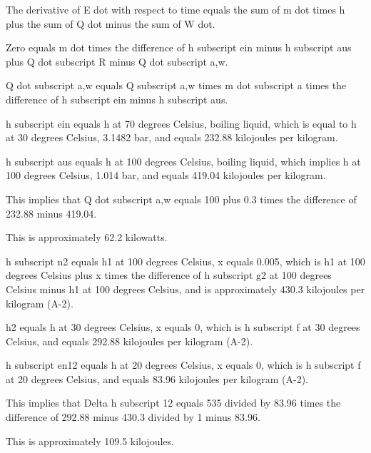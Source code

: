 The derivative of E dot with respect to time equals the sum of m dot times h plus the sum of Q dot minus the sum of W dot.

Zero equals m dot times the difference of h subscript ein minus h subscript aus plus Q dot subscript R minus Q dot subscript a,w.

Q dot subscript a,w equals Q subscript a,w times m dot subscript a times the difference of h subscript ein minus h subscript aus.

h subscript ein equals h at 70 degrees Celsius, boiling liquid, which is equal to h at 30 degrees Celsius, 3.1482 bar, and equals 232.88 kilojoules per kilogram.

h subscript aus equals h at 100 degrees Celsius, boiling liquid, which implies h at 100 degrees Celsius, 1.014 bar, and equals 419.04 kilojoules per kilogram.

This implies that Q dot subscript a,w equals 100 plus 0.3 times the difference of 232.88 minus 419.04.

This is approximately 62.2 kilowatts.

h subscript n2 equals h1 at 100 degrees Celsius, x equals 0.005, which is h1 at 100 degrees Celsius plus x times the difference of h subscript g2 at 100 degrees Celsius minus h1 at 100 degrees Celsius, and is approximately 430.3 kilojoules per kilogram (A-2).

h2 equals h at 30 degrees Celsius, x equals 0, which is h subscript f at 30 degrees Celsius, and equals 292.88 kilojoules per kilogram (A-2).

h subscript en12 equals h at 20 degrees Celsius, x equals 0, which is h subscript f at 20 degrees Celsius, and equals 83.96 kilojoules per kilogram (A-2).

This implies that Delta h subscript 12 equals 535 divided by 83.96 times the difference of 292.88 minus 430.3 divided by 1 minus 83.96.

This is approximately 109.5 kilojoules.